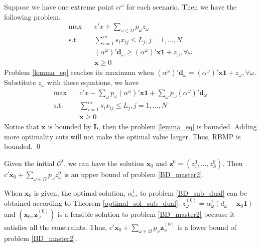 \begin{pf}
  Suppose we have one extreme point $\alpha^{\omega}$ for each scenario. Then we have the following problem.
  \begin{equation}\label{lemma_eq}
    \begin{aligned}
      \max \quad & c{'} x + \sum_{\omega \in \Omega} p_{\omega} z_{\omega} \\
      \text {s.t.} \quad & \sum_{i=1}^{m} s_{i} x_{ij} \leq L_j, j =1,\ldots, N \\
      & (\alpha^{\omega}){'}\mathbf{d}_{\omega} \geq (\alpha^{\omega}){'} \mathbf{x} \mathbf{1} + z_{\omega}, \forall \omega \\
       & \mathbf{x} \geq 0
    \end{aligned}
  \end{equation}
  Problem \eqref{lemma_eq} reaches its maximum when $(\alpha^{\omega}){'}\mathbf{d}_{\omega} = (\alpha^{\omega}){'} \mathbf{x} \mathbf{1} + z_{\omega}, \forall \omega$. Substitute $z_{\omega}$ with these equations, we have 
  \begin{equation}\label{lemma_eq2}
    \begin{aligned}
      \max \quad & c{'} x - \sum_{\omega}p_{\omega}(\alpha^{\omega}){'} \mathbf{x} \mathbf{1} + \sum_{\omega} p_{\omega} (\alpha^{\omega}){'} \mathbf{d}_{\omega} \\
      \text {s.t.} \quad & \sum_{i=1}^{m} s_{i} x_{ij} \leq L_j, j =1,\ldots, N \\
      & \mathbf{x} \geq 0
    \end{aligned}
  \end{equation}
  Notice that $\mathbf{x}$ is bounded by $\mathbf{L}$, then the problem \eqref{lemma_eq} is bounded. Adding more optimality cuts will not make the optimal value larger. Thus, RBMP is bounded. 
  \qed
\end{pf}

Given the initial $\mathcal{O}^{t}$, we can have the solution $\mathbf{x}_{0}$ and $\mathbf{z}^{0} =(z^{0}_1,\ldots, z^{0}_S)$. Then $c{'} \mathbf{x}_0 + \sum_{\omega \in \Omega} p_{\omega} z_{\omega}^{0}$ is an upper bound of problem \eqref{BD_master2}. 


When $\mathbf{x}_0$ is given, the optimal solution, $\alpha_{\omega}^{1}$, to problem \eqref{BD_sub_dual} can be obtained according to Theorem \ref{optimal_sol_sub_dual}. $z_{\omega}^{(0)} = \alpha_{\omega}^{1}(d_{\omega} - \mathbf{x}_0 \mathbf{1})$ and $(\mathbf{x}_0, \mathbf{z}_{\omega}^{(0)})$ is a feasible solution to problem \eqref{BD_master2} because it satisfies all the constraints. Thus, $c{'} \mathbf{x}_0 + \sum_{\omega \in \Omega} p_{\omega} \mathbf{z}_{\omega}^{(0)}$ is a lower bound of problem \eqref{BD_master2}.


